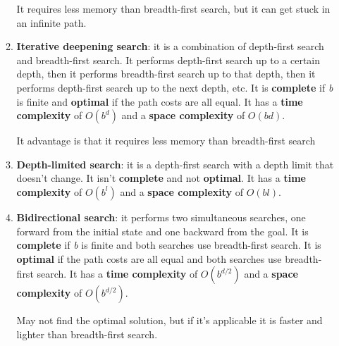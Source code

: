 \documentclass[12pt]{article}
\begin{document}
\begin{enumerate}[label=\textbf{US.\arabic*}]
\begin{enumerate}
        It requires less memory than breadth-first search, but it can get stuck in an infinite path.

        \item \textbf{Iterative deepening search}: it is a combination of depth-first search and breadth-first search.
        It performs depth-first search up to a certain depth, then it performs breadth-first search up to that depth, 
        then it performs depth-first search up to the next depth, etc.
        It is \textbf{complete} if \textit{b} is finite and \textbf{optimal} if the path costs are all equal.
        It has a \textbf{time complexity} of $O(b^d)$ and a \textbf{space complexity} of $O(bd)$.

        It advantage is that it requires less memory than breadth-first search

        \item \textbf{Depth-limited search}: it is a depth-first search with a depth limit that doesn't change.
        It isn't \textbf{complete} and not \textbf{optimal}.
        It has a \textbf{time complexity} of $O(b^l)$ and a \textbf{space complexity} of $O(bl)$.

        \item \textbf{Bidirectional search}: it performs two simultaneous searches, one forward from the initial state and one backward from the goal.
        It is \textbf{complete} if \textit{b} is finite and  both searches use breadth-first search.
        It is \textbf{optimal} if the path costs are all equal and both searches use breadth-first search.
        It has a \textbf{time complexity} of $O(b^{d/2})$ and a \textbf{space complexity} of $O(b^{d/2})$.

        May not find the optimal solution, but if it's applicable it is faster and lighter than breadth-first search.

    \end{enumerate}
    
\end{enumerate}
\end{document}
